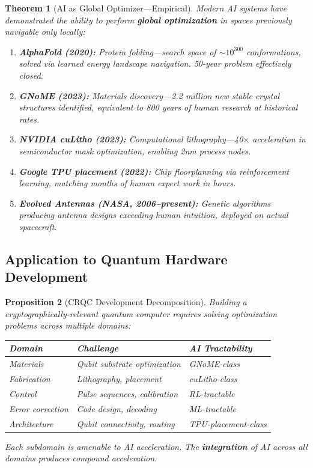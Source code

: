 \documentclass[11pt,a4paper]{article}
\newtheorem{theorem}{Theorem}[section]
\newtheorem{proposition}[theorem]{Proposition}
\begin{document}
\begin{theorem}[AI as Global Optimizer---Empirical]
Modern AI systems have demonstrated the ability to perform \textbf{global optimization} in spaces previously navigable only locally:

\begin{enumerate}[noitemsep]
    \item \textbf{AlphaFold (2020):} Protein folding---search space of $\sim 10^{300}$ conformations, solved via learned energy landscape navigation. 50-year problem effectively closed.

    \item \textbf{GNoME (2023):} Materials discovery---2.2 million new stable crystal structures identified, equivalent to 800 years of human research at historical rates.

    \item \textbf{NVIDIA cuLitho (2023):} Computational lithography---40$\times$ acceleration in semiconductor mask optimization, enabling 2nm process nodes.

    \item \textbf{Google TPU placement (2022):} Chip floorplanning via reinforcement learning, matching months of human expert work in hours.

    \item \textbf{Evolved Antennas (NASA, 2006--present):} Genetic algorithms producing antenna designs exceeding human intuition, deployed on actual spacecraft.
\end{enumerate}
\end{theorem}

\subsection{Application to Quantum Hardware Development}

\begin{proposition}[CRQC Development Decomposition]
Building a cryptographically-relevant quantum computer requires solving optimization problems across multiple domains:

\begin{center}
\begin{tabular}{lll}
\toprule
\textbf{Domain} & \textbf{Challenge} & \textbf{AI Tractability} \\
\midrule
Materials & Qubit substrate optimization & GNoME-class \\
Fabrication & Lithography, placement & cuLitho-class \\
Control & Pulse sequences, calibration & RL-tractable \\
Error correction & Code design, decoding & ML-tractable \\
Architecture & Qubit connectivity, routing & TPU-placement-class \\
\bottomrule
\end{tabular}
\end{center}

Each subdomain is amenable to AI acceleration. The \textbf{integration} of AI across all domains produces compound acceleration.
\end{proposition}
\end{document}
